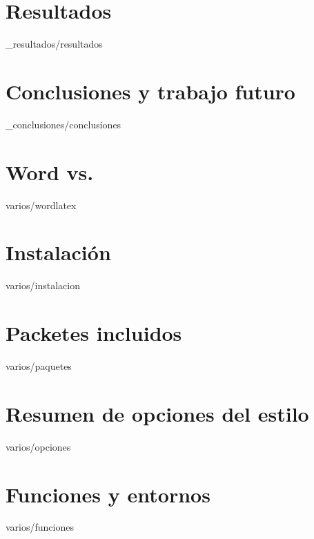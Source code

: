 \documentclass[epsbased,copyright,final,printable,covers,extendedindex,firstnumbered,tfg,gnuplot]{tfgtfmthesisuam}
\begin{document}
\chapter{Resultados\label{CAP:ELEMINT}}{_resultados/resultados}

\chapter{Conclusiones y trabajo futuro\label{CAP:ELEMINT}}{_conclusiones/conclusiones}

\appendix

\chapter{Word\textsuperscript{\textregistered} vs. \LaTeXe\label{CAP:WORDLATEX}}{varios/wordlatex}
\chapter{Instalación\label{CAP:INSTALACION}}{varios/instalacion}
\chapter{Packetes incluidos\label{CAP:PAQUETES}}{varios/paquetes}
\chapter{Resumen de opciones del estilo\label{CAP:OPCIONES}}{varios/opciones}
\chapter{Funciones y entornos\label{CAP:FUNCENT}}{varios/funciones}
\end{document}
